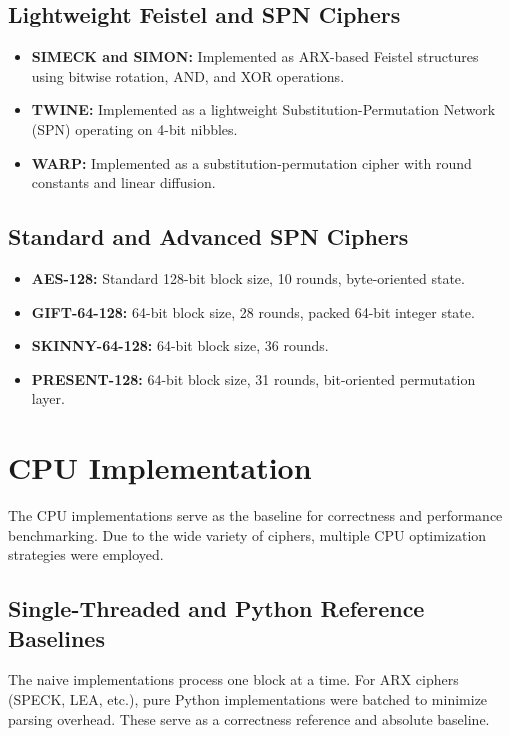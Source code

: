 \documentclass{article}
\begin{document}
\subsection{Lightweight Feistel and SPN Ciphers}
\begin{itemize}
    \item \textbf{SIMECK and SIMON:} Implemented as ARX-based Feistel structures using bitwise rotation, AND, and XOR operations.
    \item \textbf{TWINE:} Implemented as a lightweight Substitution-Permutation Network (SPN) operating on 4-bit nibbles.
    \item \textbf{WARP:} Implemented as a substitution-permutation cipher with round constants and linear diffusion.
\end{itemize}

\subsection{Standard and Advanced SPN Ciphers}
\begin{itemize}
    \item \textbf{AES-128:} Standard 128-bit block size, 10 rounds, byte-oriented state.
    \item \textbf{GIFT-64-128:} 64-bit block size, 28 rounds, packed 64-bit integer state.
    \item \textbf{SKINNY-64-128:} 64-bit block size, 36 rounds.
    \item \textbf{PRESENT-128:} 64-bit block size, 31 rounds, bit-oriented permutation layer.
\end{itemize}

\section{CPU Implementation}

The CPU implementations serve as the baseline for correctness and performance benchmarking. Due to the wide variety of ciphers, multiple CPU optimization strategies were employed.

\subsection{Single-Threaded and Python Reference Baselines}
The naive implementations process one block at a time. For ARX ciphers (SPECK, LEA, etc.), pure Python implementations were batched to minimize parsing overhead. These serve as a correctness reference and absolute baseline.
\end{document}
